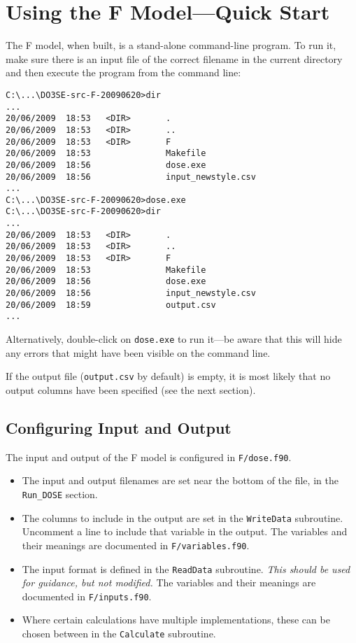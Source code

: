 \documentclass[10pt,a4paper]{article}
\begin{document}
\section{Using the F Model---Quick Start}

The F model, when built, is a stand-alone command-line program.  To run it, make sure there is an 
input file of the correct filename in the current directory and then execute the program from the 
command line:
\begin{lstlisting}
C:\...\DO3SE-src-F-20090620>dir
...
20/06/2009  18:53   <DIR>       .
20/06/2009  18:53   <DIR>       ..
20/06/2009  18:53   <DIR>       F
20/06/2009  18:53               Makefile
20/06/2009  18:56               dose.exe
20/06/2009  18:56               input_newstyle.csv
...
C:\...\DO3SE-src-F-20090620>dose.exe
C:\...\DO3SE-src-F-20090620>dir
...
20/06/2009  18:53   <DIR>       .
20/06/2009  18:53   <DIR>       ..
20/06/2009  18:53   <DIR>       F
20/06/2009  18:53               Makefile
20/06/2009  18:56               dose.exe
20/06/2009  18:56               input_newstyle.csv
20/06/2009  18:59               output.csv
...
\end{lstlisting}

Alternatively, double-click on \verb|dose.exe| to run it---be aware that this will hide any errors 
that might have been visible on the command line.

If the output file (\verb|output.csv| by default) is empty, it is most likely that no output columns 
have been specified (see the next section).

\subsection{Configuring Input and Output}

The input and output of the F model is configured in \verb|F/dose.f90|.

\begin{itemize}

\item The input and output filenames are set near the bottom of the file, in the \verb|Run_DOSE| 
section.

\item The columns to include in the output are set in the \verb|WriteData| subroutine.  Uncomment a 
line to include that variable in the output.  The variables and their meanings are documented in 
\verb|F/variables.f90|.

\item The input format is defined in the \verb|ReadData| subroutine.  \emph{This should be used for 
guidance, but not modified.}  The variables and their meanings are documented in 
\verb|F/inputs.f90|.

\item Where certain calculations have multiple implementations, these can be chosen between in the 
\verb|Calculate| subroutine.

\end{itemize}
\end{document}
